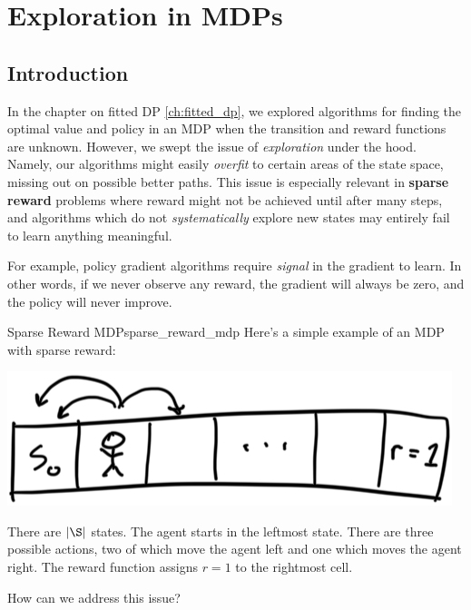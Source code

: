 \documentclass[\main/main]{subfiles}
\begin{document}
\tableofcontents

\chapter{Exploration in MDPs}

\section{Introduction}

In the chapter on fitted DP \eqref{ch:fitted_dp}, we explored algorithms for finding the optimal value and policy in an MDP when the transition and reward functions are unknown.
However, we swept the issue of \emph{exploration} under the hood.
Namely, our algorithms might easily \emph{overfit} to certain areas of the state space,
missing out on possible better paths.
This issue is especially relevant in \textbf{sparse reward} problems where reward might not be achieved until after many steps,
and algorithms which do not \emph{systematically} explore new states may entirely fail to learn anything meaningful.

For example, policy gradient algorithms require \emph{signal} in the gradient to learn. In other words, if we never observe any reward, the gradient will always be zero, and the policy will never improve.

\begin{example}{Sparse Reward MDP}{sparse_reward_mdp}
    Here's a simple example of an MDP with sparse reward:

    \begin{center}
        \includegraphics{sparse_reward_mdp}
    \end{center}

    There are $|\S|$ states.
    The agent starts in the leftmost state. There are three possible actions, two of which move the agent left and one which moves the agent right. The reward function assigns $r=1$ to the rightmost cell.
\end{example}

How can we address this issue?
\end{document}
